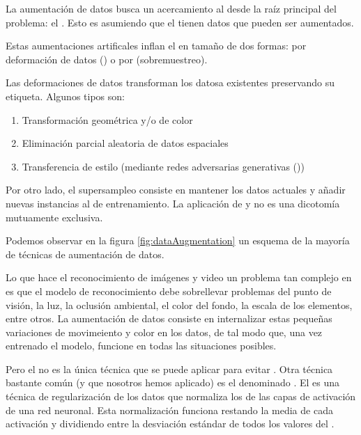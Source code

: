 La aumentación de datos busca un acercamiento al  desde la raíz principal del problema: el . Esto es asumiendo que el  tienen datos que pueden ser aumentados.

Estas aumentaciones artificales inflan el  en tamaño de dos formas: por deformación de datos () o por  (sobremuestreo).

Las deformaciones de datos transforman los datosa existentes preservando su etiqueta. Algunos tipos son:

\begin{enumerate}
  \item Transformación geométrica y/o de color
  \item Eliminación parcial aleatoria de datos espaciales
  \item Transferencia de estilo (mediante redes adversarias generativas ())
\end{enumerate}

Por otro lado, el supersampleo consiste en mantener los datos actuales y añadir nuevas instancias al  de entrenamiento. La aplicación de  y  no es una dicotomía mutuamente exclusiva.

Podemos observar en la figura \ref{fig:dataAugmentation} un esquema de la mayoría de técnicas de aumentación de datos.


Lo que hace el reconocimiento de imágenes y video un problema tan complejo en  es que el modelo de reconocimiento debe sobrellevar problemas del punto de visión, la luz, la oclusión ambiental, el color del fondo, la escala de los elementos, entre otros. La aumentación de datos consiste en internalizar estas pequeñas variaciones de movimeiento y color en los datos, de tal modo que, una vez entrenado el modelo, funcione en todas las situaciones posibles.

Pero el  no es la única técnica que se puede aplicar para evitar . Otra técnica bastante común (y que nosotros hemos aplicado) es el denominado . El  es una técnica de regularización de los datos que normaliza los  de las capas de activación de una red neuronal. Esta normalización funciona restando la media de cada activación y dividiendo entre la desviación estándar de todos los valores del  .
